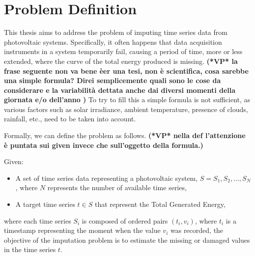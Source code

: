 \section{Problem Definition}
This thesis aims to address the problem of imputing time series data from
photovoltaic systems. Specifically, it often happens that data acquisition
instruments in a system temporarily fail, causing a period of time, more or
less extended, where the curve of the total energy produced is missing.
	{\bf (*VP* la frase seguente non va bene èer una tesi, non è scientifica, cosa sarebbe una simple formula? Direi semplicemente quali sono le cose da considerare e la variabilità dettata anche dai diversi momenti della giornata e/o dell'anno )}
To try to fill this  a simple formula is not sufficient,
as various factors such as solar irradiance, ambient temperature,
presence of clouds, rainfall, etc., need to be taken into account.

Formally, we can define the problem as follows. \textbf{(*VP* nella def l'attenzione è puntata sui given invece che sull'oggetto della formula.)}

\begin{definition}
	Given:
	\begin{itemize}
		\item A set of time series data representing a photovoltaic
		      system, $S = {S_1, S_2, \ldots, S_N}$, where $N$ represents
		      the number of available time series,
		\item A target time series $t \in S$ that represent the Total Generated Energy,
	\end{itemize}
	where each time series $S_i$ is composed of ordered pairs $(t_i, v_i)$, where $t_i$ is
	a timestamp representing the moment when the value $v_i$ was recorded,
	the objective of the imputation problem is to estimate the missing or damaged values
	in the time series $t$.
\end{definition}

